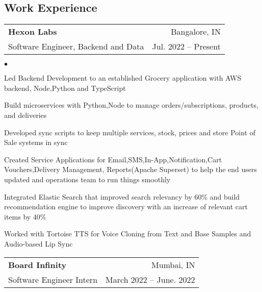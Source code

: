 \documentclass[margin, 11pt]{res}
\makeatletter
\newcommand{\li}{https://linkedin.com/in/harishvadaparty}
\newcommand{\gh}{https://github.com/Harryalways317}
\newcommand{\personalsite}{https://hvadaparty.vercel.app}
\newcommand{\resumeSubheading}[4]{

\begin{tabular*}{1.01\textwidth}{@{\hspace{-4pt}}l @{\extracolsep{\fill}} r}
\textbf{#1} & #2 \\
      {#3} &  {#4}
\end{tabular*}\vspace{-2pt}
}
\newenvironment{list2}{
	\begin{list}{$\bullet$}{%
	    \small
		\setlength{\itemsep}{0in}
		\setlength{\parsep}{0in} \setlength{\parskip}{0in}
		\setlength{\topsep}{0in} \setlength{\partopsep}{0in}
		\setlength{\leftmargin}{0.2in}}}{\end{list}}
\makeatother
\begin{document}
\address{
    \href{https://hvadaparty.vercel.app}{Portfolio} $|$
    \href{mailto:harishvadapartygmail.com}{harishvadaparty@gmail.com} $|$ 
    \href{\li}{linkedin.com/in/harishvadaparty} $|$
    \href{\gh}{github.com/Harryalways317}
}

\begin{resume}

\section{\sc Work Experience}

\vspace{2pt}

\resumeSubheading{{\bf Hexon Labs}}{Bangalore, IN}
                 {Software Engineer, Backend and Data}{Jul. 2022 -- Present}

\begin{list2}
\item{Led Backend Development to an established Grocery application with AWS backend, Node,Python and TypeScript}
\item{Build microservices with Python,Node to  manage orders/subscriptions, products, and deliveries}
\item{Developed sync scripts to keep multiple services, stock, prices and store Point of Sale systems in sync}
\item{Created Service Applications for Email,SMS,In-App,Notification,Cart Vouchers,Delivery Management, Reports(Apache Superset) to help the end users updated and operations team to run things smoothly}
\item{Integrated Elastic Search that improved search relevancy by 60\% and build recommendation engine to improve discovery with an increase of relevant cart items by 40\% }
\item{Worked with Tortoise TTS for Voice Cloning from Text and Base Samples and Audio-based Lip Sync}
\end{list2}
\resumeSubheading{{\bf Board Infinity}}{Mumbai, IN}
                 {Software Engineer Intern}{March 2022 -- June. 2022}
                 

\end{resume}
\end{document}
